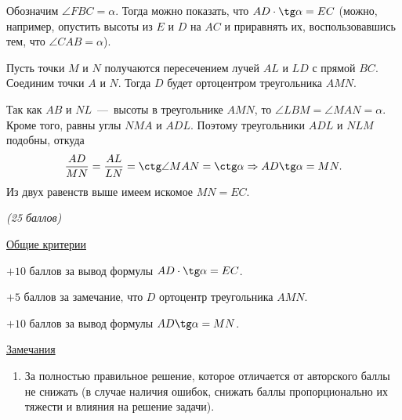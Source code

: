 \solutionSection
Обозначим $\angle FBC = \alpha$. Тогда можно показать, что $AD \cdot \tg \alpha = EC$ (можно, например, опустить высоты из $E$ и $D$ на $AC$ и приравнять их, воспользовавшись тем, что $\angle CAB = \alpha$).
	 
Пусть точки $M$ и $N$ получаются пересечением лучей $AL$ и $LD$ с прямой $BC$. Соединим точки $A$ и $N$. Тогда $D$ будет ортоцентром треугольника $AMN$.
	
Так как $AB$ и $NL$~---~высоты в треугольнике $AMN$, то $\angle LBM = \angle MAN = \alpha$. Кроме того, равны углы $NMA$ и $ADL$. Поэтому треугольники $ADL$ и $NLM$ подобны, откуда
$$\frac{AD}{MN} = \frac{AL}{LN} = \ctg \angle MAN = \ctg \alpha \Rightarrow AD \tg \alpha = MN.$$
Из двух равенств выше имеем искомое $MN = EC$.

\additionalCriteria
\textit{(25 баллов)}

	\underline{Общие критерии}

	$+10$ баллов за вывод формулы $AD \cdot \tg \alpha = EC$.
	
	$+5$ баллов за замечание, что $D$ ортоцентр треугольника $AMN$.
	
	$+10$ баллов за вывод формулы $AD \tg \alpha = MN$.
	
	\underline{Замечания} 
\begin{enumerate}
	\item За полностью правильное решение, 
	которое отличается от авторского баллы не снижать
	(в случае наличия ошибок, снижать баллы пропорционально 
	их тяжести и влияния на решение задачи).
\end{enumerate}